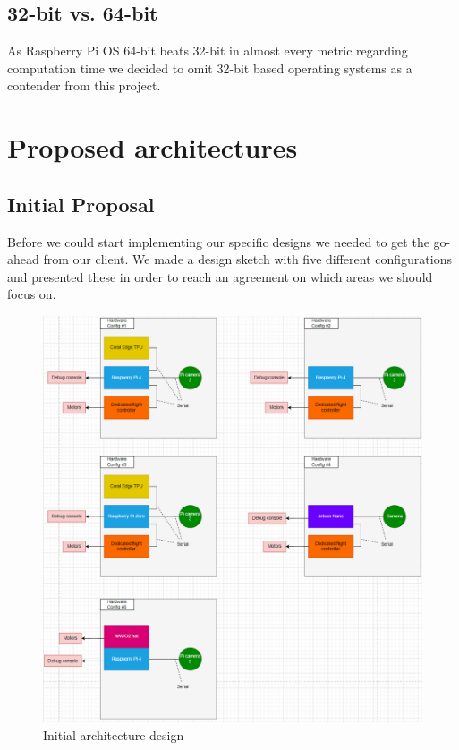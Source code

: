 \subsection{32-bit vs. 64-bit}
As Raspberry Pi OS 64-bit beats 32-bit in almost every metric regarding computation time \cite{32-bit_vs_64-bit} we decided to omit 32-bit based operating systems as a contender from this project.

\section{Proposed architectures}
\subsection{Initial Proposal}

Before we could start implementing our specific designs we needed to get the go-ahead from our client. We made a design sketch with five different configurations and presented these in order to reach an agreement on which areas we should focus on.

\begin{figure}[!h]
    \centering
    \includegraphics[scale=0.35]{fig/arkitektur.png}
    \caption{Initial architecture design}
    \label{fig:architecture}
\end{figure}
\newpage

